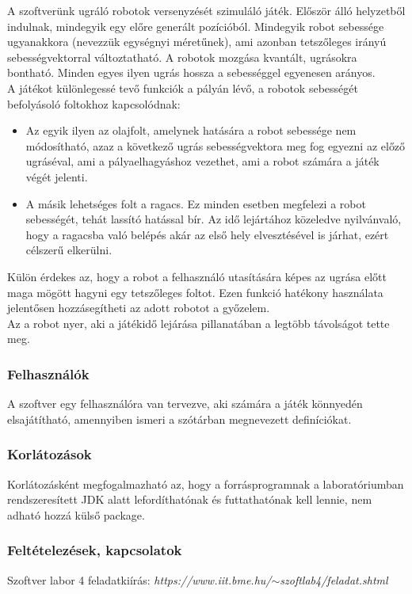 A szoftverünk ugráló robotok versenyzését szimuláló játék. Először álló helyzetből indulnak, mindegyik egy előre generált pozícióból. Mindegyik robot sebessége ugyanakkora (nevezzük egységnyi méretűnek), ami azonban tetszőleges irányú sebességvektorral változtatható. A robotok mozgása kvantált, ugrásokra bontható. Minden egyes ilyen ugrás hossza a sebességgel egyenesen arányos. \\

A játékot különlegessé tevő funkciók a pályán lévő, a robotok sebességét befolyásoló foltokhoz kapcsolódnak:

\begin{itemize}
	\item Az egyik ilyen az olajfolt, amelynek hatására a robot sebessége nem módosítható, azaz a következő ugrás sebességvektora meg fog egyezni az előző ugráséval, ami a pályaelhagyáshoz vezethet, ami a robot számára a játék végét jelenti.
	\item A másik lehetséges folt a ragacs. Ez minden esetben megfelezi a robot sebességét, tehát lassító hatással bír. Az idő lejártához közeledve nyilvánvaló, hogy a ragacsba való belépés akár az első hely elvesztésével is járhat, ezért célszerű elkerülni.
\end{itemize}

Külön érdekes az, hogy a robot a felhasználó utasítására képes az ugrása előtt maga mögött hagyni egy tetszőleges foltot. Ezen funkció hatékony használata jelentősen hozzásegítheti az adott robotot a győzelem. \\

Az a robot nyer, aki a játékidő lejárása pillanatában a legtöbb távolságot tette meg.
 

\subsubsection{Felhasználók}

A szoftver egy felhasználóra van tervezve, aki számára a játék könnyedén elsajátítható, amennyiben ismeri a szótárban megnevezett definíciókat.

\subsubsection{Korlátozások}

Korlátozásként megfogalmazható az, hogy a forrásprogramnak a laboratóriumban rendszeresített JDK alatt lefordíthatónak és futtathatónak kell lennie, nem adható hozzá külső package.

\subsubsection{Feltételezések, kapcsolatok}

Szoftver labor 4 feladatkiírás: \textit{https://www.iit.bme.hu/$\sim$szoftlab4/feladat.shtml}